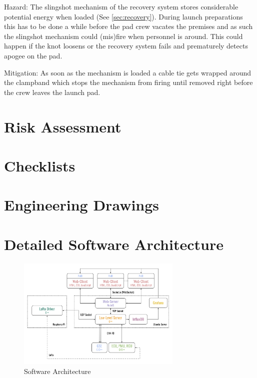 Hazard: The slingshot mechanism of the recovery system stores considerable potential energy when loaded (See \cref{sec:recovery}). During launch preparations this has to be done a while before the pad crew vacates the premises and as such the slingshot mechanism could (mis)fire when personnel is around. This could happen if the knot loosens or the recovery system fails and prematurely detects apogee on the pad.

Mitigation: As soon as the mechanism is loaded a cable tie gets wrapped around the clampband which stops the mechanism from firing until removed right before the crew leaves the launch pad.

\section{Risk Assessment}



\section{Checklists}



\section{Engineering Drawings}







\section{Detailed Software Architecture}\label{sec:software}

\begin{figure}[h]
    \centering
    \includegraphics[width=0.7\textwidth]{Appendices/Software Architecture.png}
    \caption{Software Architecture}
    \label{fig:software}
\end{figure}


